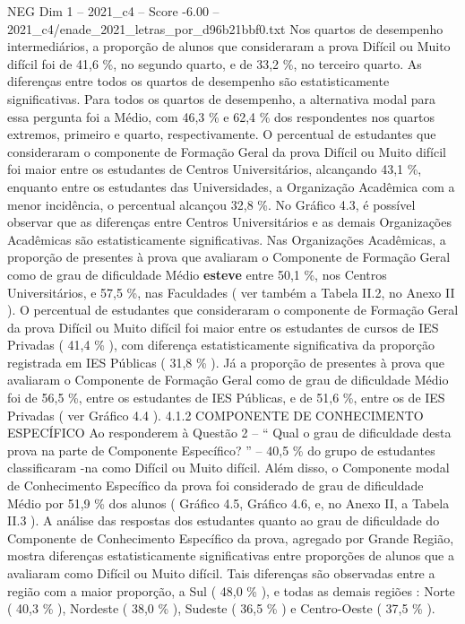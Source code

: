 \begin{textsample}{NEG Dim 1 – 2021\_c4 – Score -6.00 – 2021\_c4/enade\_2021\_letras\_por\_d96b21bbf0.txt}
Nos quartos de desempenho intermediários, a proporção de alunos que consideraram a prova Difícil ou Muito difícil foi de 41,6 \%, no segundo quarto, e de 33,2 \%, no terceiro quarto.
As diferenças entre todos os quartos de desempenho são estatisticamente significativas.
Para todos os quartos de desempenho, a alternativa modal para essa pergunta foi a Médio, com 46,3 \% e 62,4 \% dos respondentes nos quartos extremos, primeiro e quarto, respectivamente.
O percentual de estudantes que consideraram o componente de Formação Geral da prova Difícil ou Muito difícil foi maior entre os estudantes de Centros Universitários, alcançando 43,1 \%, enquanto entre os estudantes das Universidades, a Organização Acadêmica com a menor incidência, o percentual alcançou 32,8 \%.
No Gráfico 4.3, é possível observar que as diferenças entre Centros Universitários e as demais Organizações Acadêmicas são estatisticamente significativas.
Nas Organizações Acadêmicas, a proporção de presentes à prova que avaliaram o Componente de Formação Geral como de grau de dificuldade Médio \textbf{esteve} entre 50,1 \%, nos Centros Universitários, e 57,5 \%, nas Faculdades ( ver também a Tabela II.2, no Anexo II ).
O percentual de estudantes que consideraram o componente de Formação Geral da prova Difícil ou Muito difícil foi maior entre os estudantes de cursos de IES Privadas ( 41,4 \% ), com diferença estatisticamente significativa da proporção registrada em IES Públicas ( 31,8 \% ).
Já a proporção de presentes à prova que avaliaram o Componente de Formação Geral como de grau de dificuldade Médio foi de 56,5 \%, entre os estudantes de IES Públicas, e de 51,6 \%, entre os de IES Privadas ( ver Gráfico 4.4 ). 4.1.2 COMPONENTE DE CONHECIMENTO ESPECÍFICO Ao responderem à Questão 2 – “ Qual o grau de dificuldade desta prova na parte de Componente Específico? ” – 40,5 \% do grupo de estudantes classificaram -na como Difícil ou Muito difícil.
Além disso, o Componente modal de Conhecimento Específico da prova foi considerado de grau de dificuldade Médio por 51,9 \% dos alunos ( Gráfico 4.5, Gráfico 4.6, e, no Anexo II, a Tabela II.3 ).
A análise das respostas dos estudantes quanto ao grau de dificuldade do Componente de Conhecimento Específico da prova, agregado por Grande Região, mostra diferenças estatisticamente significativas entre proporções de alunos que a avaliaram como Difícil ou Muito difícil.
Tais diferenças são observadas entre a região com a maior proporção, a Sul ( 48,0 \% ), e todas as demais regiões : Norte ( 40,3 \% ), Nordeste ( 38,0 \% ), Sudeste ( 36,5 \% ) e Centro-Oeste ( 37,5 \% ).

\end{textsample}
